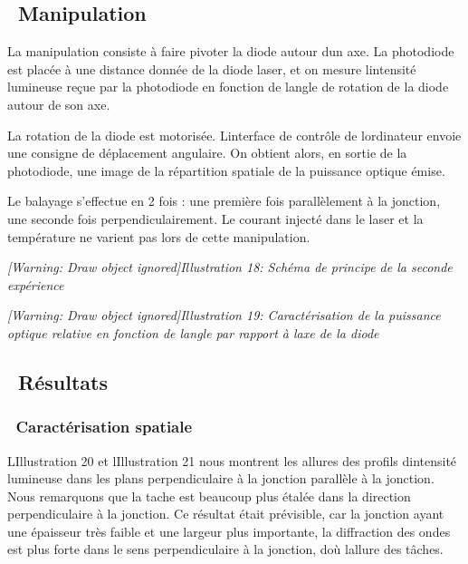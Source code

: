 \documentclass[12pt,twoside]{article}
\begin{document}
\subsection[\ Manipulation]{\ Manipulation}
La manipulation consiste \`a faire pivoter la diode autour
d{\textquotesingle}un axe. La photodiode est plac\'ee \`a une distance
donn\'ee de la diode laser, et on mesure l{\textquotesingle}intensit\'e
lumineuse re\c{c}ue par la photodiode en fonction de
l{\textquotesingle}angle de rotation de la diode autour de son axe.

La rotation de la diode est motoris\'ee. L{\textquotesingle}interface de
contr\^ole de l{\textquotesingle}ordinateur envoie une consigne de
d\'eplacement angulaire. On obtient alors, en sortie de la photodiode,
une image de la r\'epartition spatiale de la puissance optique \'emise.

Le balayage s'effectue en 2 fois : une premi\`ere fois parall\`element
\`a la jonction, une seconde fois perpendiculairement. Le courant
inject\'e dans le laser et la temp\'erature ne varient pas lors de
cette manipulation.

\begin{minipage}{15.253cm}
{\itshape
[Warning: Draw object ignored]Illustration 18: Sch\'ema de principe de
la seconde exp\'erience}
\end{minipage}

\begin{minipage}{15.253cm}
{\itshape
[Warning: Draw object ignored]Illustration 19: Caract\'erisation de la
puissance optique relative en fonction de l{\textquotesingle}angle par
rapport \`a l{\textquotesingle}axe de la diode}
\end{minipage}

\subsection[\ R\'esultats]{\ R\'esultats}
\subsubsection[\ Caract\'erisation spatiale]{\ Caract\'erisation
spatiale}
L{\textquotesingle}Illustration 20 et l{\textquotesingle}Illustration 21
nous montrent les allures des profils d{\textquotesingle}intensit\'e
lumineuse dans les plans perpendiculaire \`a la jonction parall\`ele
\`a la jonction. Nous remarquons que la tache est beaucoup plus
\'etal\'ee dans la direction perpendiculaire \`a la jonction. Ce
r\'esultat \'etait pr\'evisible, car la jonction ayant une \'epaisseur
tr\`es faible et une largeur plus importante, la diffraction des ondes
est plus forte dans le sens perpendiculaire \`a la jonction,
d{\textquotesingle}o\`u l{\textquotesingle}allure des t\^aches.
\end{document}
